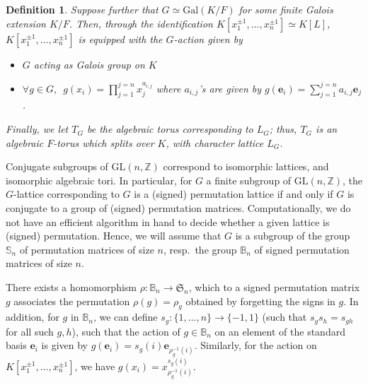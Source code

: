 \documentclass[12pt]{article}
\theoremstyle{plain}
\newtheorem{definition}[theorem]{Definition}
\newcommand{\Z}{\ensuremath{\mathbb{Z}}}
\begin{document}
\begin{definition}
  Suppose further that $G \simeq \mathrm{Gal}(K/F)$ for some finite
  Galois extension $K/F$. Then, through the identification $K[x_1^{\pm
      1}, \ldots , x_n^{\pm 1}]\simeq K[L]$, $K[x_1^{\pm 1}, \ldots ,
    x_n^{\pm 1}]$ is equipped with the $G$-action given by
  \begin{itemize}
  \item $G$ acting as Galois group on $K$
  \item $\forall g \in G, \,\,\, g(x_i) = \prod_{j=1}^{j=n}
    x_j^{a_{i,j}}$ where $a_{i,j}$'s are given by $g(\textbf{e}_i) =
    \sum_{j=1}^{j=n} a_{i,j}\textbf{e}_j$.
  \end{itemize}
  Finally, we let $T_G$ be the algebraic torus corresponding to $L_G$;
  thus, $T_G$ is an algebraic $F$-torus which splits over $K$, with
  character lattice $L_G$.
\end{definition}
Conjugate subgroups of $\mathrm{GL}(n,\Z)$ correspond to isomorphic
lattices, and isomorphic algebraic tori. In particular, for $G$ a
finite subgroup of $ \mathrm{GL}(n,\mathbb{Z})$, the $G$-lattice
corresponding to $G$ is a (signed) permutation lattice if and only if
$G$ is conjugate to a group of (signed) permutation matrices.
Computationally, we do not have an efficient algorithm in hand to
decide whether a given lattice is (signed) permutation. Hence, we will
assume that $G$ is a subgroup of the group $\mathbb{S}_n$ of
permutation matrices of size $n$, resp.\ the group $\mathbb{B}_n$ of
signed permutation matrices of size $n$.

There exists a homomorphism $\rho: \mathbb{B}_n \longrightarrow
\mathfrak{S}_n$, which to a signed permutation matrix $g$ associates
the permutation $\rho(g) = \rho_g$ obtained by forgetting the signs in
$g$. In addition, for $g$ in $\mathbb{B}_n$, we can define $s_g:
\{1,\dots,n\} \to \{-1,1\}$ (such that $s_g s_h =s_{gh}$ for all such
$g,h$), such that the action of $g \in \mathbb{B}_n$ on an element of
the standard basis $\mathbf{e}_i$ is given by $g(\mathbf{e}_i) =
s_g(i) \mathbf{e}_{\rho_g^{-1}(i)}$. Similarly, for the action on
$K[x_1^{\pm 1}, \ldots , x_n^{\pm 1}]$, we have $g(x_i) =
x_{\rho_g^{-1}(i)}^{s_g(i)}.$






 

\end{document}
